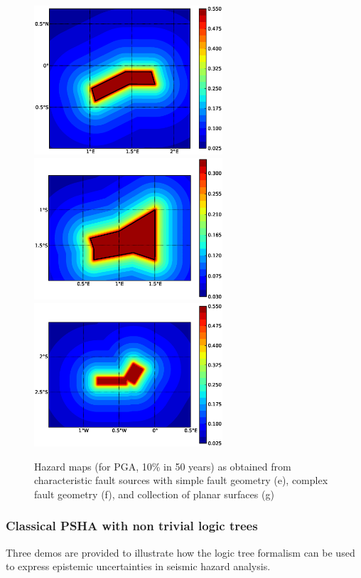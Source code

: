 \begin{figure} 
\centering 
\subcaptionbox{}
{\includegraphics[width=7cm]{./figures/hazard/char_fault2.eps}} 
\subcaptionbox{}
{\includegraphics[width=7cm]{./figures/hazard/char_fault3.eps}} 
\subcaptionbox{}
{\includegraphics[width=7cm]{./figures/hazard/char_fault1.eps}} 
\caption{Hazard maps (for PGA, 10\% in 50 years) as obtained from 
    characteristic fault sources with simple fault
    geometry (e), complex fault geometry (f), and collection of 
    planar surfaces (g)}
\label{fig:hazard_maps2}
\end{figure}

\clearpage
\subsubsection{Classical PSHA with non trivial logic trees}
Three demos are provided to illustrate how the logic tree formalism can 
be used to express epistemic uncertainties in seismic hazard analysis.\\

